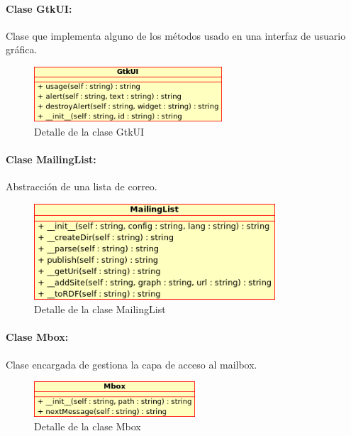 \paragraph{Clase GtkUI:}

Clase que implementa alguno de los métodos usado en una interfaz de usuario
gráfica.

\begin{figure}[H]
	\centering
 	\includegraphics[width=7cm]{images/uml/clases/gtkui-class.png}
	\caption{Detalle de la clase GtkUI}
	\label{fig:uml:swaml-class}
\end{figure}

\paragraph{Clase MailingList:}

Abstracción de una lista de correo.

\begin{figure}[H]
	\centering
 	\includegraphics[width=9cm]{images/uml/clases/mailinglist-class.png}
	\caption{Detalle de la clase MailingList}
	\label{fig:uml:mailinglist-class}
\end{figure}

\paragraph{Clase Mbox:}

Clase encargada de gestiona la capa de acceso al mailbox.

\begin{figure}[H]
	\centering
 	\includegraphics[width=6cm]{images/uml/clases/mbox-class.png}
	\caption{Detalle de la clase Mbox}
	\label{fig:uml:mbox-class}
\end{figure}

